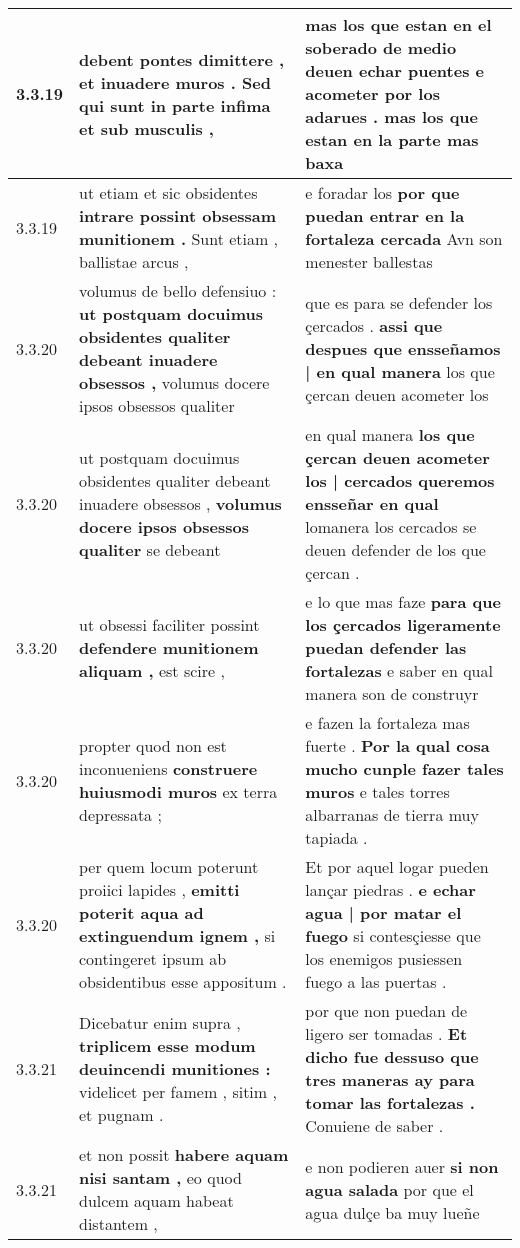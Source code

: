 \begin{tabular}{|p{1cm}|p{6.5cm}|p{6.5cm}|}
3.3.19 & debent pontes dimittere , \textbf{ et inuadere muros . } Sed qui sunt in parte infima et sub musculis , & mas los que estan en el soberado de medio deuen echar puentes \textbf{ e acometer por los adarues . } mas los que estan en la parte mas baxa \\\hline
3.3.19 & ut etiam et sic obsidentes \textbf{ intrare possint obsessam munitionem . } Sunt etiam , ballistae arcus , & e foradar los \textbf{ por que puedan entrar en la fortaleza cercada } Avn son menester ballestas \\\hline
3.3.20 & volumus de bello defensiuo : \textbf{ ut postquam docuimus obsidentes qualiter debeant inuadere obsessos , } volumus docere ipsos obsessos qualiter & que es para se defender los çercados . \textbf{ assi que despues que ensseñamos | en qual manera } los que çercan deuen acometer los \\\hline
3.3.20 & ut postquam docuimus obsidentes qualiter debeant inuadere obsessos , \textbf{ volumus docere ipsos obsessos qualiter } se debeant & en qual manera \textbf{ los que çercan deuen acometer los | cercados queremos ensseñar en qual } lomanera los cercados se deuen defender de los que çercan . \\\hline
3.3.20 & ut obsessi faciliter possint \textbf{ defendere munitionem aliquam , } est scire , & e lo que mas faze \textbf{ para que los çercados ligeramente puedan defender las fortalezas } e saber en qual manera son de construyr \\\hline
3.3.20 & propter quod non est inconueniens \textbf{ construere huiusmodi muros } ex terra depressata ; & e fazen la fortaleza mas fuerte . \textbf{ Por la qual cosa mucho cunple fazer tales muros } e tales torres albarranas de tierra muy tapiada . \\\hline
3.3.20 & per quem locum poterunt proiici lapides , \textbf{ emitti poterit aqua ad extinguendum ignem , } si contingeret ipsum ab obsidentibus esse appositum . & Et por aquel logar pueden lançar piedras . \textbf{ e echar agua | por matar el fuego } si contesçiesse que los enemigos pusiessen fuego a las puertas . \\\hline
3.3.21 & Dicebatur enim supra , \textbf{ triplicem esse modum deuincendi munitiones : } videlicet per famem , sitim , et pugnam . & por que non puedan de ligero ser tomadas . \textbf{ Et dicho fue dessuso que tres maneras ay para tomar las fortalezas . } Conuiene de saber . \\\hline
3.3.21 & et non possit \textbf{ habere aquam nisi santam , } eo quod dulcem aquam habeat distantem , & e non podieren auer \textbf{ si non agua salada } por que el agua dulçe ba muy lueñe \\\hline

\end{tabular}
